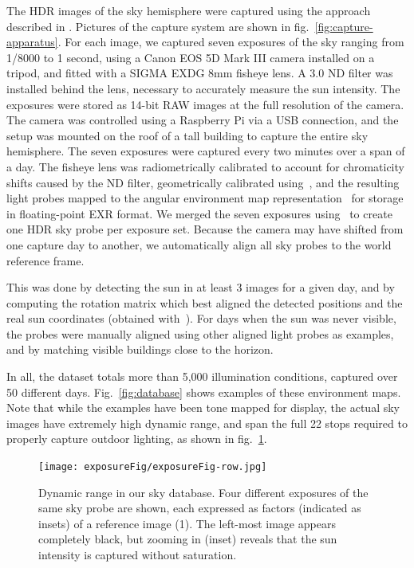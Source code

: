 The HDR images of the sky hemisphere were captured using the approach described in \cite{stumpfel-afrigraph-04}. Pictures of the capture system are shown in fig.~\ref{fig:capture-apparatus}. For each image, we captured seven exposures of the sky ranging from 1/8000 to 1 second, using a Canon EOS 5D Mark III camera installed on a tripod, and fitted with a SIGMA EXDG 8mm fisheye lens. A 3.0 ND filter was installed behind the lens, necessary to accurately measure the sun intensity. The exposures were stored as 14-bit RAW images at the full resolution of the camera. The camera was controlled using a Raspberry Pi via a USB connection, and the setup was mounted on the roof of a tall building to capture the entire sky hemisphere. The seven exposures were captured every two minutes over a span of a day. The fisheye lens was radiometrically calibrated to account for chromaticity shifts caused by the ND filter, geometrically calibrated using~\cite{scaramuzza-iros-09}, and the resulting light probes mapped to the angular environment map representation~\cite{reinhard-book-05} for storage in floating-point EXR format. We merged the seven exposures using~\cite{debevec-siggraph-97} to create one HDR sky probe per exposure set. Because the camera may have shifted from one capture day to another, we automatically align all sky probes to the world reference frame.

This was done by detecting the sun in at least 3 images for a given day, and by computing the rotation matrix which best aligned the detected positions and the real sun coordinates (obtained with~\cite{reda-se-04}). For days when the sun was never visible, the probes were manually aligned using other aligned light probes as examples, and by matching visible buildings close to the horizon.

In all, the dataset totals more than 5,000 illumination conditions, captured over 50 different days. Fig.~\ref{fig:database} shows examples of these environment maps. Note that while the examples have been tone mapped for display, the actual sky images have extremely high dynamic range, and span the full 22 stops required to properly capture outdoor lighting, as shown in fig.~\ref{fig:exposure}.

\begin{figure}
\centering
\texttt{[image: exposureFig/exposureFig-row.jpg]}
\caption{Dynamic range in our sky database. Four different exposures of the same sky probe are shown, each expressed as factors (indicated as insets) of a reference image (1). The left-most image appears completely black, but zooming in (inset) reveals that the sun intensity is captured without saturation.}
\label{fig:exposure}
\end{figure}


